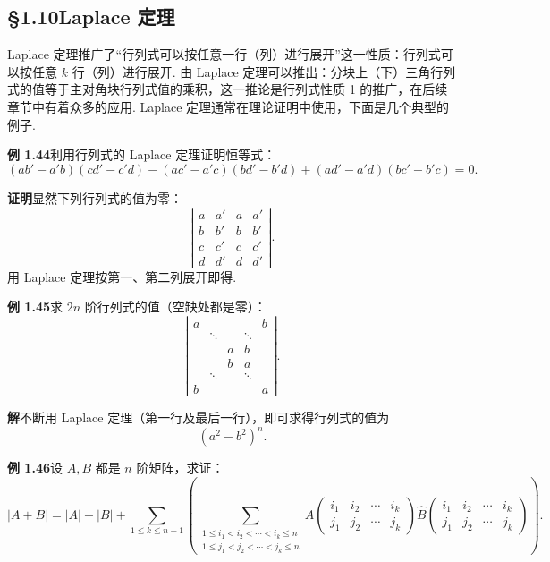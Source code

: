 \documentclass[UTF8,12pt,a4paper,fontset=fandol]{ctexart}
\begin{document}
\subsection*{§1.10\quad Laplace 定理}

Laplace 定理推广了“行列式可以按任意一行（列）进行展开”这一性质：行列式可以按任意 $k$ 行（列）进行展开. 由 Laplace 定理可以推出：分块上（下）三角行列式的值等于主对角块行列式值的乘积，这一推论是行列式性质 1 的推广，在后续章节中有着众多的应用. Laplace 定理通常在理论证明中使用，下面是几个典型的例子.

\noindent\textbf{例 1.44}\quad 利用行列式的 Laplace 定理证明恒等式：
\[
(ab'-a'b)(cd'-c'd)-(ac'-a'c)(bd'-b'd)+(ad'-a'd)(bc'-b'c)=0.
\]

\noindent\textbf{证明}\quad 显然下列行列式的值为零：
\[
\left|\begin{array}{cccc}
a & a' & a & a'\\
b & b' & b & b'\\
c & c' & c & c'\\
d & d' & d & d'
\end{array}\right|.
\]
用 Laplace 定理按第一、第二列展开即得.

\noindent\textbf{例 1.45}\quad 求 $2n$ 阶行列式的值（空缺处都是零）：
\[
\left|\begin{array}{ccccc}
a &        &        &        & b\\
  & \ddots &        & \ddots & \\
  &        & a & b  & \\
  &        & b & a  & \\
  & \ddots &       & \ddots & \\
b &        &        &        & a
\end{array}\right|.
\]

\noindent\textbf{解}\quad 不断用 Laplace 定理（第一行及最后一行），即可求得行列式的值为
\[
(a^2-b^2)^n.
\]

\noindent\textbf{例 1.46}\quad 设 $A,B$ 都是 $n$ 阶矩阵，求证：
\[
|A+B|=|A|+|B|+
\sum_{1\le k\le n-1}
\left(
\sum_{\substack{1\le i_1<i_2<\cdots<i_k\le n\\
1\le j_1<j_2<\cdots<j_k\le n}}
A\begin{pmatrix}i_1&i_2&\cdots&i_k\\ j_1&j_2&\cdots&j_k\end{pmatrix}
\widehat{B}\begin{pmatrix}i_1&i_2&\cdots&i_k\\ j_1&j_2&\cdots&j_k\end{pmatrix}
\right).
\]
\end{document}
